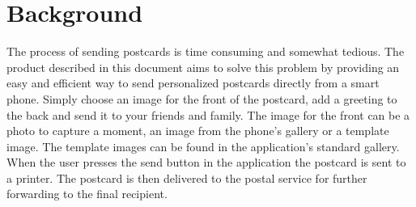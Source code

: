 \documentclass[10pt,a4paper]{article}
\begin{document}
\section{Background}
The process of sending postcards is time consuming and somewhat tedious. The product described in this document aims to solve this problem by providing an easy and efficient way to send personalized postcards directly from a smart phone. Simply choose an image for the front of the postcard, add a greeting to the back and send it to your friends and family. The image for the front can be a photo to capture a moment, an image from the phone's gallery or a template image. The template images can be found in the application's standard gallery. When the user presses the send button in the application the postcard is sent to a printer. The postcard is then delivered to the postal service for further forwarding to the final recipient. 

%
%

\end{document}
